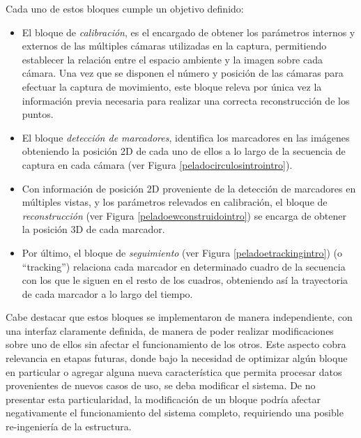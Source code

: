 Cada uno de estos bloques cumple un objetivo definido:
\begin{itemize}
\item El bloque de \emph{calibración}, es el encargado de obtener los parámetros internos y externos de las múltiples cámaras utilizadas en la captura, permitiendo establecer la relación entre el espacio ambiente y la imagen sobre cada cámara. Una vez que se disponen el número y posición de las cámaras para efectuar la captura de movimiento, este bloque releva por única vez la información previa necesaria para realizar una correcta reconstrucción de los puntos.
\item El bloque \emph{detección de marcadores}, identifica los marcadores en las imágenes obteniendo la posición 2D de cada uno de ellos a lo largo de la secuencia de captura en cada cámara (ver Figura \ref{peladocirculosintrointro}).
\item Con información de posición 2D proveniente de la detección de marcadores en múltiples vistas, y los parámetros relevados en calibración, el bloque de \emph{reconstrucción} (ver Figura \ref{peladoewconstruidointro}) se encarga de obtener la posición 3D de cada marcador.
\item Por último, el bloque de \emph{seguimiento} (ver Figura \ref{peladoetrackingintro})
(o ``tracking'') relaciona cada marcador en determinado cuadro de la secuencia con los que le siguen en el resto de los cuadros, obteniendo así la trayectoria de cada marcador a lo largo del tiempo.
\end{itemize}

Cabe destacar que estos bloques se implementaron de manera independiente, con una interfaz claramente definida, de manera  de poder realizar modificaciones sobre uno de ellos sin afectar el funcionamiento de los otros. Este aspecto cobra relevancia en etapas futuras, donde bajo la necesidad de optimizar algún bloque en particular o agregar alguna nueva característica que permita procesar datos provenientes de nuevos casos de uso, se deba modificar el sistema. De no presentar esta particularidad, la modificación de un bloque podría afectar negativamente el funcionamiento del sistema completo, requiriendo una posible re-ingeniería de la estructura.

